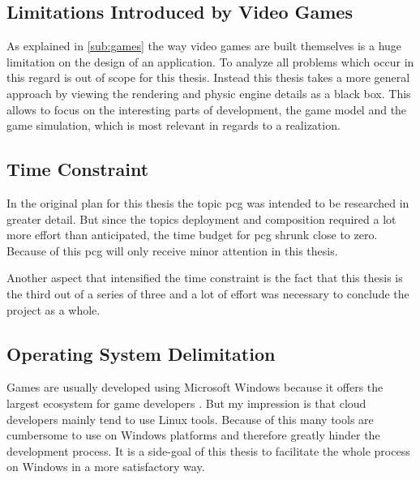 \subsection{Limitations Introduced by Video Games}
As explained in \autoref{sub:games} the way video games are built themselves is
a huge limitation on the design of an \og{} application. To analyze all problems
which occur in this regard is out of scope for this thesis. Instead this thesis
takes a more general approach by viewing the rendering and physic engine
details as a black box. This allows to focus on the interesting parts of \og{}
development, the game model and the game simulation, which is most relevant in
regards to a \ms{} realization.

\subsection{Time Constraint}
In the original plan for this thesis the topic  \gls{pcg} was
intended to be researched in greater detail. But since the topics deployment and
composition required a lot more effort than anticipated, the time budget for
\gls{pcg} shrunk close to zero. Because of this \gls{pcg} will only receive
minor attention in this thesis.

Another aspect that intensified the time constraint is the fact that this thesis
is the third out of a series of three and a lot of effort was necessary to
conclude the project as a whole.

\subsection{Operating System Delimitation}
\label{sub:delimitations}

Games are usually developed using Microsoft Windows because it offers the
largest ecosystem for game developers \cite{bolas2013games_dev_windows}. But my
impression is that cloud developers mainly tend to use Linux tools. Because of
this many tools are cumbersome to use on Windows platforms and therefore greatly
hinder the development process. It is a side-goal of this thesis to facilitate
the whole process on Windows in a more satisfactory way.\\





















